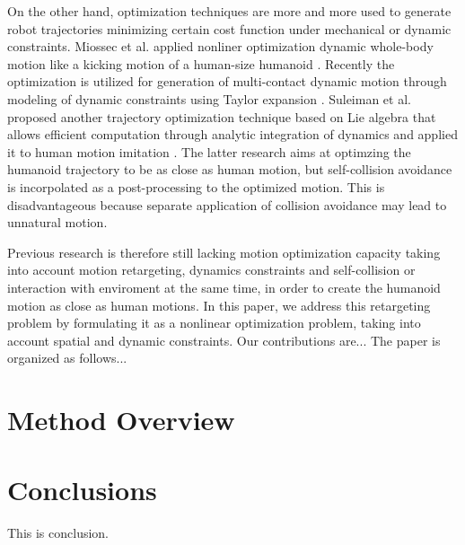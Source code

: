 \documentclass[letterpaper, 10 pt, conference]{ieeeconf}  %
\begin{document}
On the other hand, optimization techniques are more and more used to
generate robot trajectories minimizing certain cost function under
mechanical or dynamic constraints.
Miossec et al. applied nonliner optimization dynamic whole-body motion
like a kicking motion of a human-size humanoid \cite{Miossec06ROBIO}.
Recently the optimization is utilized for generation of multi-contact
dynamic motion through modeling of dynamic constraints using Taylor
expansion \cite{Lengagne13IJRR}.
Suleiman et al. proposed another trajectory optimization technique
based on Lie 
algebra that allows efficient computation through analytic integration
of dynamics \cite{Suleiman07Humanoids} and applied it to human motion
imitation \cite{Suleiman08ICRA}. 
The latter research aims at optimzing the humanoid trajectory to be as
close as human motion, but self-collision avoidance is incorpolated as
a post-processing to the optimized motion. This is disadvantageous
because separate application of collision avoidance may lead to
unnatural motion. 


Previous research is therefore still lacking 
motion optimization capacity taking into account
motion retargeting, dynamics constraints and
self-collision or interaction with enviroment at the same time, in
order to create the humanoid motion as close as human motions.
In this paper, we address this retargeting problem by formulating it
as a nonlinear optimization problem, taking into account spatial and
dynamic constraints.
Our contributions are...
The paper is organized as follows...

\section{Method Overview}
\label{sec:overview}


\section{Conclusions}

This is conclusion.

\end{document}

